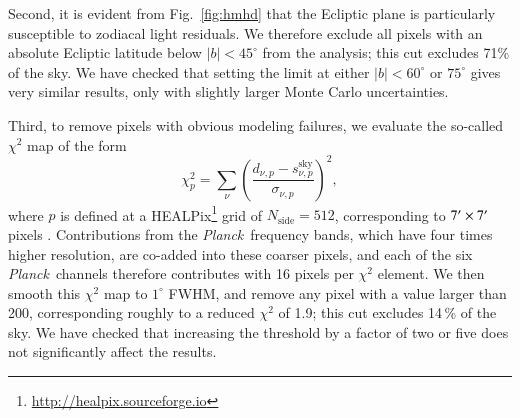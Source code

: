 \documentclass{aa}
\def\Planck{\textit{Planck}}
\begin{document}
Second, it is evident from Fig.~\ref{fig:hmhd} that the Ecliptic
plane is particularly susceptible to zodiacal light residuals. We
therefore exclude all pixels with an absolute Ecliptic latitude below
$|b|<45^{\circ}$ from the analysis; this cut excludes 71\% of the
sky. We have checked that setting the limit at either $|b|<60^{\circ}$
or $75^{\circ}$ gives very similar results, only with slightly larger
Monte Carlo uncertainties.

Third, to remove pixels with obvious modeling failures, we
evaluate the so-called $\chi^2$ map of the form
\begin{equation}
\chi_p^2 = \sum_{\nu} \left(\frac{d_{\nu,p}-s_{\nu,p}^{\mathrm{sky}}}{\sigma_{\nu,p}}\right)^2,
\end{equation}
where $p$ is defined at a HEALPix\footnote{\url{http://healpix.sourceforge.io}} grid of $N_{\mathrm{side}}=512$,
corresponding to $7\arcmin\times 7\arcm$ pixels
\citep{healpix}. Contributions from the \Planck\ frequency bands,
which have four times higher resolution, are co-added into these
coarser pixels, and each of the six \Planck\ channels therefore
contributes with 16 pixels per $\chi^2$ element. We then smooth this
$\chi^2$ map to $1^{\circ}$ FWHM, and remove any pixel with a value
larger than 200, corresponding roughly to a reduced $\chi^2$ of 1.9;
this cut excludes 14\,\% of the sky. We have checked that increasing the
threshold by a factor of two or five does not significantly affect the
results.
\end{document}
